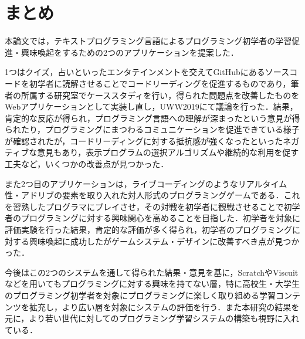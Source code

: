 \section{まとめ}

本論文では，テキストプログラミング言語によるプログラミング初学者の学習促進・興味喚起をするための2つのアプリケーションを提案した．

1つはクイズ，占いといったエンタテインメントを交えてGitHubにあるソースコードを初学者に読解させることでコードリーディングを促進するものであり，筆者の所属する研究室でケーススタディを行い，得られた問題点を改善したものをWebアプリケーションとして実装し直し，UWW2019にて議論を行った．結果，肯定的な反応が得られ，プログラミング言語への理解が深まったという意見が得られたり，プログラミングにまつわるコミュニケーションを促進できている様子が確認されたが，コードリーディングに対する抵抗感が強くなったといったネガティブな意見もあり，表示プログラムの選択アルゴリズムや継続的な利用を促す工夫など，いくつかの改善点が見つかった．

また2つ目のアプリケーションは，ライブコーディングのようなリアルタイム性・アドリブの要素を取り入れた対人形式のプログラミングゲームである．これを習熟したプログラマにプレイさせ，その対戦を初学者に観戦させることで初学者のプログラミングに対する興味関心を高めることを目指した．初学者を対象に評価実験を行った結果，肯定的な評価が多く得られ，初学者のプログラミングに対する興味喚起に成功したがゲームシステム・デザインに改善すべき点が見つかった．

今後はこの2つのシステムを通して得られた結果・意見を基に，ScratchやViscuitなどを用いてもプログラミングに対する興味を持てない層，特に高校生・大学生のプログラミング初学者を対象にプログラミングに楽しく取り組める学習コンテンツを拡充し，より広い層を対象にシステムの評価を行う．また本研究の結果を元に，より若い世代に対してのプログラミング学習システムの構築も視野に入れている． 